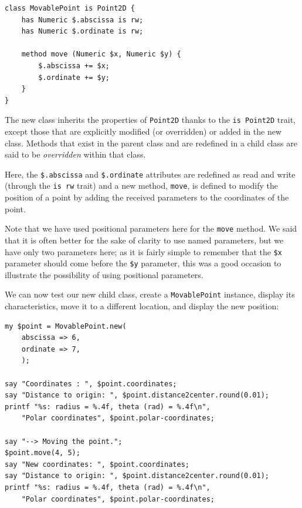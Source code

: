 \begin{verbatim}
class MovablePoint is Point2D {
    has Numeric $.abscissa is rw;
    has Numeric $.ordinate is rw;
    
    method move (Numeric $x, Numeric $y) {
        $.abscissa += $x;
        $.ordinate += $y;
    }
}
\end{verbatim}

The new class inherits the properties of {\tt Point2D} thanks 
to the {\tt is Point2D} trait, except those that are explicitly 
modified (or overridden) or added in the new class. 
Methods that exist in the parent class and are 
redefined in a child class are said to be \emph{overridden} 
within that class. 

Here, the \verb'$.abscissa' and \verb'$.ordinate' attributes are 
redefined as read and write (through the {\tt is rw} trait) and 
a new method, {\tt move}, is defined to modify the position of 
a point by adding the received parameters to the coordinates 
of the point.

Note that we have used positional parameters here for the 
{\tt move} method. We said that it is often better for the sake of clarity 
to use named parameters, but we have only two parameters here; 
as it is fairly simple to remember that the \verb'$x' 
parameter should come before the \verb'$y' parameter, this 
was a good occasion to illustrate the possibility of using 
positional parameters.

We can now test our new child class, create a {\tt MovablePoint} 
instance, display its characteristics, move it to a different 
location, and display the new position:

\begin{verbatim}
my $point = MovablePoint.new(
    abscissa => 6,
    ordinate => 7,
    );

say "Coordinates : ", $point.coordinates;
say "Distance to origin: ", $point.distance2center.round(0.01);
printf "%s: radius = %.4f, theta (rad) = %.4f\n", 
    "Polar coordinates", $point.polar-coordinates;

say "--> Moving the point.";
$point.move(4, 5);
say "New coordinates: ", $point.coordinates;
say "Distance to origin: ", $point.distance2center.round(0.01);
printf "%s: radius = %.4f, theta (rad) = %.4f\n", 
    "Polar coordinates", $point.polar-coordinates;
\end{verbatim}

